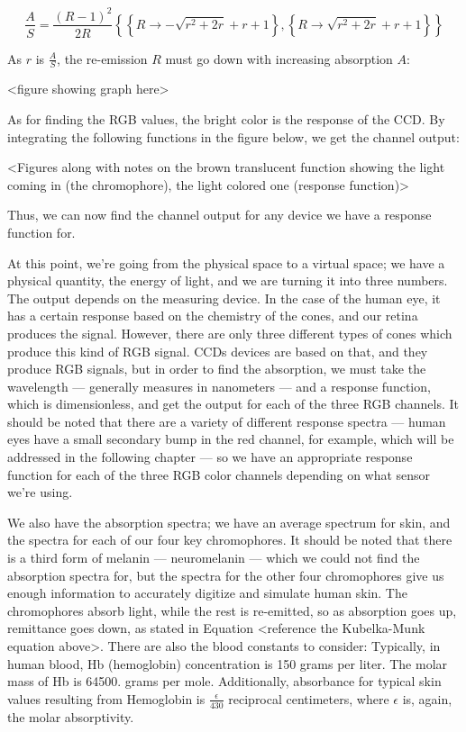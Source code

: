 \begin{equation}\label{eq:KubelkaMunk2}
\frac{A}{S}=\frac{(R-1)^2}{2 R}
\left\{\left\{R\to -\sqrt{r^2+2 r}+r+1\right\},\left\{R\to \sqrt{r^2+2 r}+r+1\right\}\right\}
\end{equation}

As $r$ is $\frac{A}{S}$, the re-emission $R$ must go down with increasing absorption $A$:

<figure showing graph here>

As for finding the RGB values, the bright color is the response of the CCD. By integrating the following functions in the figure below, we get the channel output:

<Figures along with notes on the brown translucent function showing the light coming in (the chromophore), the light colored one (response function)>

Thus, we can now find the channel output for any device we have a response function for.

At this point, we're going from the physical space to a virtual space; we have a physical quantity, the energy of light, and we are turning it into three numbers. The output depends on the measuring device. In the case of the human eye, it has a certain response based on the chemistry of the cones, and our retina produces the signal. However, there are only three different types of cones which produce this kind of RGB signal. CCDs devices are based on that, and they produce RGB signals, but in order to find the absorption, we must take the wavelength --- generally measures in nanometers --- and a response function, which is dimensionless, and get the output for each of the three RGB channels. It should be noted that there are a variety of different response spectra --- human eyes have a small secondary bump in the red channel, for example, which will be addressed in the following chapter --- so we have an appropriate response function for each of the three RGB color channels depending on what sensor we're using.

We also have the absorption spectra; we have an average spectrum for skin, and the spectra for each of our four key chromophores. It should be noted that there is a third form of melanin --- neuromelanin --- which we could not find the absorption spectra for, but the spectra for the other four chromophores give us enough information to accurately digitize and simulate human skin. The chromophores absorb light, while the rest is re-emitted, so as absorption goes up, remittance goes down, as stated in Equation <reference the Kubelka-Munk equation above>. There are also the blood constants to consider: Typically, in human blood, Hb (hemoglobin) concentration is 150 grams per liter. The molar mass of Hb is 64500. grams per mole. Additionally, absorbance for typical skin values resulting from Hemoglobin is $\frac{\epsilon}{430}$ reciprocal centimeters, where $\epsilon$ is, again, the molar absorptivity.

